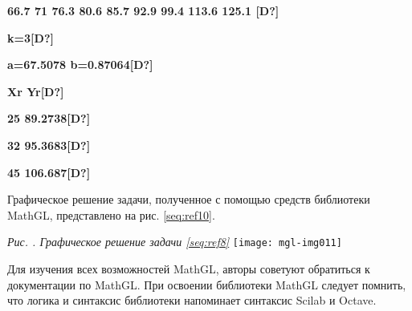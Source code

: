 {\bfseries
66.7 71 76.3 80.6 85.7 92.9 99.4 113.6 125.1 \textlatin{[D?]}}

{\bfseries
k=3\textlatin{[D?]}}

{\bfseries
a=67.5078 b=0.87064\textlatin{[D?]}}

{\bfseries
Xr  Yr\textlatin{[D?]}}

{\bfseries
25 89.2738\textlatin{[D?]}}

{\bfseries
32 95.3683\textlatin{[D?]}}

{\bfseries
45 106.687\textlatin{[D?]}}

Графическое решение задачи, полученное с помощью средств библиотеки MathGL, представлено на рис. \ref{seq:ref10}.

\begin{minipage}{15.956cm}
{\itshape
Рис. {\theqwertya\label{seq:ref10}}. Графическое решение задачи \ref{seq:ref8}}
\texttt{[image: mgl-img011]}\end{minipage}

Для изучения всех возможностей MathGL, авторы советуют обратиться к документации по MathGL. При освоении библиотеки
MathGL следует помнить, что логика и синтаксис библиотеки напоминает синтаксис Scilab и  Octave.

\clearpage\printindex
%

\endinput

